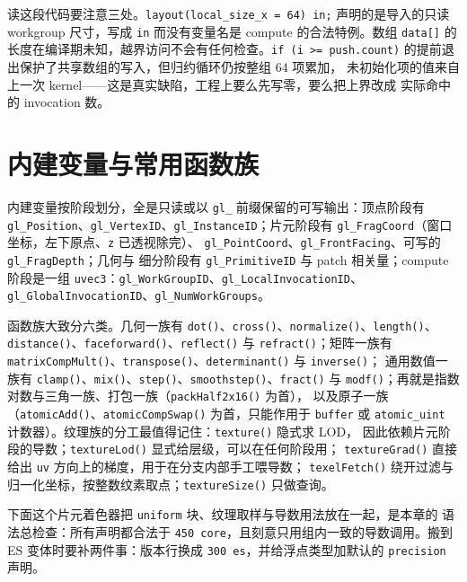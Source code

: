 \documentclass[12pt,a4paper,fontset=fandol]{ctexbook}
\newcommand{\Fn}[1]{\texttt{#1()}}
\newcommand{\Tp}[1]{\texttt{#1}}
\newcommand{\Bk}{\discretionary{}{}{}}
\begin{document}
读这段代码要注意三处。\Tp{layout(local\_size\_x = 64) in;} 声明的是导入的只读
workgroup 尺寸，写成 \Tp{in} 而没有变量名是 compute 的合法特例。数组
\Tp{data[]} 的长度在编译期未知，越界访问不会有任何检查。\Tp{if (i >= push.count)}
的提前退出保护了共享数组的写入，但归约循环仍按整组 64 项累加，
未初始化项的值来自上一次 kernel——这是真实缺陷，工程上要么先写零，要么把上界改成
实际命中的 invocation 数。

\section{内建变量与常用函数族}

内建变量按阶段划分，全是只读或以 \Tp{gl\_} 前缀保留的可写输出：顶点阶段有
\Tp{gl\_{\Bk}Position}、\Tp{gl\_{\Bk}VertexID}、\Tp{gl\_{\Bk}InstanceID}；片元阶段有
\Tp{gl\_{\Bk}Frag{\Bk}Coord}（窗口坐标，左下原点、\Tp{z} 已透视除完）、
\Tp{gl\_{\Bk}Point{\Bk}Coord}、\Tp{gl\_{\Bk}Front{\Bk}Facing}、可写的 \Tp{gl\_{\Bk}Frag{\Bk}Depth}；几何与
细分阶段有 \Tp{gl\_{\Bk}PrimitiveID} 与 patch 相关量；compute 阶段是一组
\Tp{uvec3}：\Tp{gl\_{\Bk}Work{\Bk}GroupID}、\Tp{gl\_{\Bk}Local{\Bk}InvocationID}、
\Tp{gl\_{\Bk}Global{\Bk}InvocationID}、\Tp{gl\_{\Bk}Num{\Bk}Work{\Bk}Groups}。

函数族大致分六类。几何一族有 \Fn{dot}、\Fn{cross}、\Fn{normalize}、\Fn{length}、
\Fn{distance}、\Fn{faceforward}、\Fn{reflect} 与 \Fn{refract}；矩阵一族有
\Fn{matrix{\Bk}Comp{\Bk}Mult}、\Fn{transpose}、\Fn{determinant} 与 \Fn{inverse}；
通用数值一族有 \Fn{clamp}、\Fn{mix}、\Fn{step}、\Fn{smoothstep}、\Fn{fract} 与
\Fn{modf}；再就是指数对数与三角一族、打包一族（\Fn{pack{\Bk}Half2x16} 为首），
以及原子一族（\Fn{atomicAdd}、\Fn{atomic{\Bk}Comp{\Bk}Swap} 为首，只能作用于 \Tp{buffer} 或
\Tp{atomic\_{\Bk}uint} 计数器）。纹理族的分工最值得记住：\Fn{texture} 隐式求 LOD，
因此依赖片元阶段的导数；\Fn{textureLod} 显式给层级，可以在任何阶段用；
\Fn{textureGrad} 直接给出 \Tp{uv} 方向上的梯度，用于在分支内部手工喂导数；
\Fn{texelFetch} 绕开过滤与归一化坐标，按整数纹素取点；\Fn{textureSize} 只做查询。

下面这个片元着色器把 \Tp{uniform} 块、纹理取样与导数用法放在一起，是本章的
语法总检查：所有声明都合法于 \Tp{450 core}，且刻意只用组内一致的导数调用。搬到
ES 变体时要补两件事：版本行换成 \Tp{300 es}，并给浮点类型加默认的
\Tp{precision} 声明。
\end{document}
